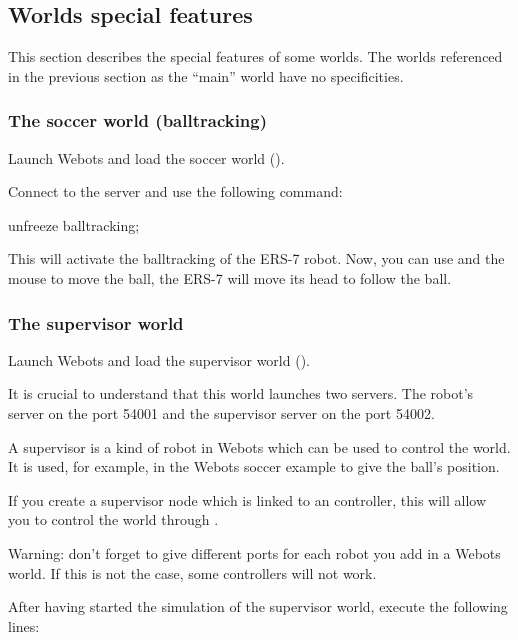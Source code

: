 \subsection{Worlds special features}
\label{webots.builtin.worlds}%

This section describes the special features of some worlds.  The
worlds referenced in the previous section as the ``main'' world have
no specificities.


\subsubsection{The soccer world (balltracking)}
\label{webots.builtin.worlds.soccer}%

Launch Webots and load the soccer world
().


Connect to the \urbi server and use the following command:

\begin{urbifixme}
unfreeze balltracking;
\end{urbifixme}

This will activate the balltracking of the ERS-7 robot.  Now, you can
use  and the mouse to move the ball, the ERS-7 will move
its head to follow the ball.


\subsubsection{The supervisor world}
\label{webots.builtin.worlds.supervisor}%

Launch Webots and load the supervisor world
().

It is crucial to understand that this world launches two \urbi
servers.  The robot's server on the port 54001 and the supervisor
server on the port 54002.

A supervisor is a kind of robot in Webots which can be used to control
the world. It is used, for example, in the Webots soccer example to
give the ball's position.

If you create a supervisor node which is linked to an \urbi
controller, this will allow you to control the world through \urbi.

Warning: don't forget to give different ports for each robot you add
in a Webots world. If this is not the case, some controllers will not
work.

After having started the simulation of the supervisor world, execute
the following lines:


